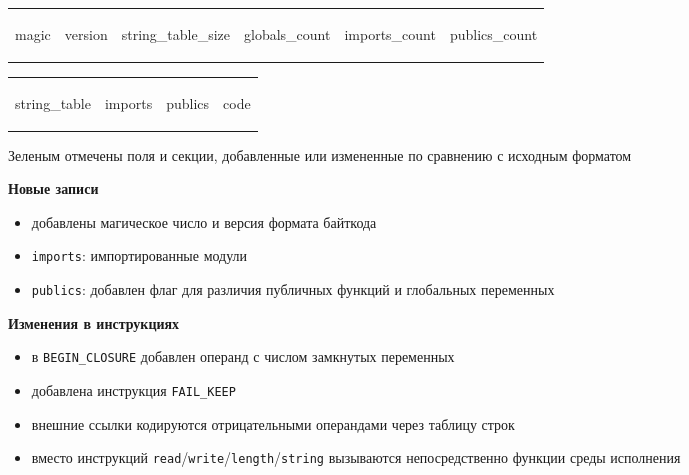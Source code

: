 \centering
\scriptsize
\setlength{\tabcolsep}{2pt}
\renewcommand{\arraystretch}{1.15}
\begin{tabular}{cccccc}
    \colorbox{green!17}{\strut magic} &
    \colorbox{green!17}{\strut version} &
    \colorbox{gray!12}{\strut string\_table\_size} &
    \colorbox{gray!12}{\strut globals\_count} &
    \colorbox{green!17}{\strut imports\_count} &
    \colorbox{gray!12}{\strut publics\_count}
\end{tabular}

\vspace{0.35em}

\begin{tabular}{cccc}
    \colorbox{gray!12}{\strut string\_table} &
    \colorbox{green!17}{\strut imports} &
    \colorbox{green!17}{\strut publics} &
    \colorbox{gray!12}{\strut code}
\end{tabular}

\vspace{0.5em}

\footnotesize
Зеленым отмечены поля и секции, добавленные или измененные по сравнению с исходным форматом

\vspace{0.8em}

\noindent
\begin{minipage}[t]{0.46\linewidth}
    \textbf{Новые записи}
    \begin{itemize}
        \item добавлены магическое число и версия формата байткода
        \item \texttt{imports}: импортированные модули
        \item \texttt{publics}: добавлен флаг для различия публичных функций и глобальных переменных
    \end{itemize}
\end{minipage}\hfill
\begin{minipage}[t]{0.5\linewidth}
    \textbf{Изменения в инструкциях}
    \begin{itemize}
        \item в \texttt{BEGIN\_CLOSURE} добавлен операнд с числом замкнутых переменных
        \item добавлена инструкция \texttt{FAIL\_KEEP}
        \item внешние ссылки кодируются отрицательными операндами через таблицу строк
        \item вместо инструкций \texttt{read}/\texttt{write}/\texttt{length}/\texttt{string} вызываются непосредственно функции среды исполнения
    \end{itemize}
\end{minipage}
